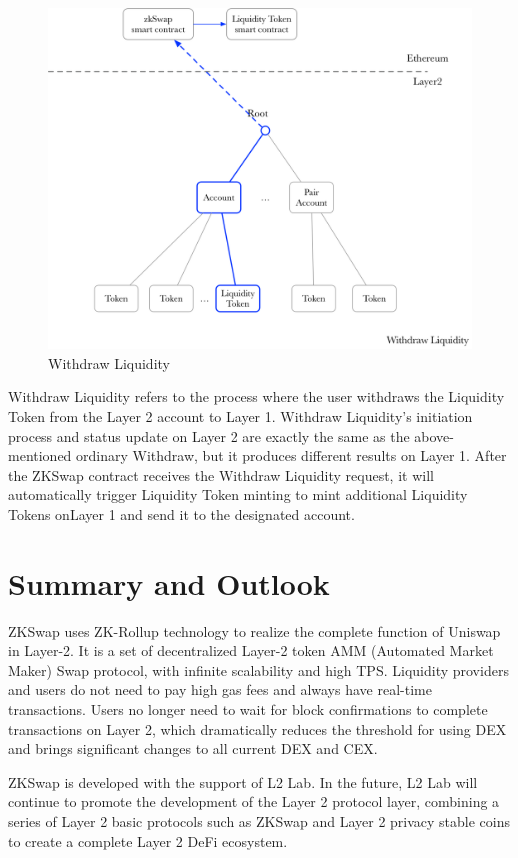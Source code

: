 \documentclass[]{template/llncs}
\begin{document}
\begin{figure}[htbp]
\centering
\includegraphics[width=0.9\columnwidth]{figure/withdraw_liquidity}
\caption{Withdraw Liquidity}
\label{fig:withdraw_liquidity}
\end{figure}

Withdraw Liquidity refers to the process where the user withdraws the Liquidity Token from the Layer 2 account to Layer 1. Withdraw Liquidity’s initiation process and status update on Layer 2 are exactly the same as the above-mentioned ordinary Withdraw, but it produces different results on Layer 1. After the ZKSwap contract receives the Withdraw Liquidity request, it will automatically trigger Liquidity Token minting to mint additional Liquidity Tokens onLayer 1 and send it to the designated account.


\section{Summary and Outlook}

ZKSwap uses ZK-Rollup technology to realize the complete function of Uniswap in Layer-2. It is a set of decentralized Layer-2 token AMM (Automated Market Maker) Swap protocol, with infinite scalability and high TPS. Liquidity providers and users do not need to pay high gas fees and always have real-time transactions. Users no longer need to wait for block confirmations to complete transactions on Layer 2, which dramatically reduces the threshold for using DEX and brings significant changes to all current DEX and CEX.

ZKSwap is developed with the support of L2 Lab. In the future, L2 Lab will continue to promote the development of the Layer 2 protocol layer, combining a series of Layer 2 basic protocols such as ZKSwap and Layer 2 privacy stable coins to create a complete Layer 2 DeFi ecosystem.
\end{document}
